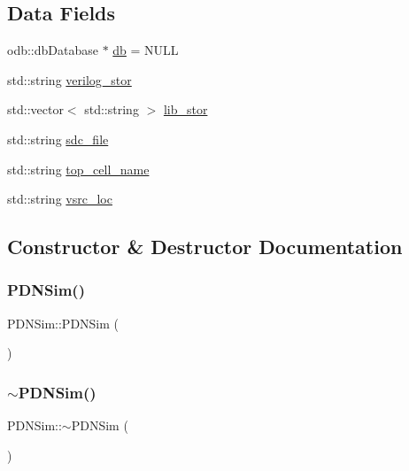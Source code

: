 \subsection*{Data Fields}
\begin{DoxyCompactItemize}
\item 
odb\+::db\+Database $\ast$ \hyperlink{classPDNSim_aecd39e9621180889427114a100eed4ee}{db} = N\+U\+LL
\item 
std\+::string \hyperlink{classPDNSim_a526364ea889a59bb8641ddaba5dea50b}{verilog\+\_\+stor}
\item 
std\+::vector$<$ std\+::string $>$ \hyperlink{classPDNSim_a5bcecd849508622164cef69f3028c17e}{lib\+\_\+stor}
\item 
std\+::string \hyperlink{classPDNSim_ab299467db1763bd18f4580f1d6bfcbbb}{sdc\+\_\+file}
\item 
std\+::string \hyperlink{classPDNSim_a47ca7ab521eb36f2f3b7bc64935714f8}{top\+\_\+cell\+\_\+name}
\item 
std\+::string \hyperlink{classPDNSim_a90890b7b495942e15b4ded550acae4ee}{vsrc\+\_\+loc}
\end{DoxyCompactItemize}


\subsection{Constructor \& Destructor Documentation}
\mbox{\label{classPDNSim_a86bc07bbf31d1110f88903fa70726b0b}} 
\subsubsection{\texorpdfstring{P\+D\+N\+Sim()}{PDNSim()}}
{\footnotesize\ttfamily P\+D\+N\+Sim\+::\+P\+D\+N\+Sim (\begin{DoxyParamCaption}{ }\end{DoxyParamCaption})}

\mbox{\label{classPDNSim_a0d0fc2643b7352981e5913ae2c47d9cb}} 
\subsubsection{\texorpdfstring{$\sim$\+P\+D\+N\+Sim()}{~PDNSim()}}
{\footnotesize\ttfamily P\+D\+N\+Sim\+::$\sim$\+P\+D\+N\+Sim (\begin{DoxyParamCaption}{ }\end{DoxyParamCaption})}




